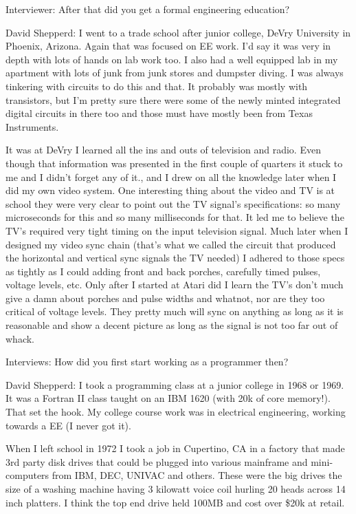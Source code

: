 \textcolor{interviewer}{Interviewer:} After that did you get a formal engineering education?

\textcolor{interviewee}{David Shepperd:} I went to a trade school after junior college, DeVry University in Phoenix, Arizona. Again that was focused on EE work. I'd say it was very in depth with lots of hands on lab work too. I also had a well equipped lab in my apartment with lots of junk from junk stores and dumpster diving. I was always tinkering with circuits to do this and that. It probably was mostly with transistors, but I'm pretty sure there were some of the newly minted integrated digital circuits in there too and those must have mostly been from Texas Instruments. 

It was at DeVry I learned all the ins and outs of television and radio. Even though that information was presented in the first couple of quarters it stuck to me and I didn't forget any of it., and I drew on all the knowledge later when I did my own video system. One interesting thing about the video and TV is at school they were very clear to point out the TV signal's specifications: so many microseconds for this and so many milliseconds for that. It led me to believe the TV's required very tight timing on the input television signal. Much later when I designed my video sync chain (that’s what we called the circuit that produced the horizontal and vertical sync signals the TV needed) I adhered to those specs as tightly as I could adding front and back porches, carefully timed pulses, voltage levels, etc. Only after I started at Atari did I learn the TV's don't much give a damn about porches and pulse widths and whatnot, nor are they too critical of voltage levels. They pretty much will sync on anything as long as it is reasonable and show a decent picture as long as the signal is not too far out of whack.

Interviews: How did you first start working as a programmer then?

\textcolor{interviewee}{David Shepperd:} I took a programming class at a junior college in 1968 or 1969. It was a Fortran II class taught on an IBM 1620 (with 20k of core memory!). That set the hook. My college course work was in electrical engineering, working towards a EE (I never got it). 

When I left school in 1972 I took a job in Cupertino, CA in a factory that made 3rd party disk drives that could be plugged into various mainframe and mini-computers from IBM, DEC, UNIVAC and others. These were the big drives the size of a washing machine having 3 kilowatt voice coil hurling 20 heads across 14 inch platters. I think the top end drive held 100MB and cost over \$20k at retail. 

